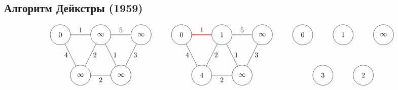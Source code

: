 \documentclass[12pt, a4paper]{article}
\begin{document}
    \subsection{Алгоритм Дейкстры (1959)}
    \[\begin{tikzpicture}
        \node[circle, draw, minimum size=1cm] (A) at (0, 0) {0};
        \node[circle, draw, minimum size=1cm] (B) at (2, 0) {$\infty$};
        \node[circle, draw, minimum size=1cm] (C) at (4, 0) {$\infty$};
        \node[circle, draw, minimum size=1cm] (D) at (1, -2) {$\infty$};
        \node[circle, draw, minimum size=1cm] (E) at (3, -2) {$\infty$};
    
        \draw (A) -- (B) node[midway, above] {1};
        \draw (A) -- (D) node[midway, left] {4};
        \draw (B) -- (D) node[midway, right] {2};
        \draw (B) -- (C) node[midway, above] {5};
        \draw (B) -- (E) node[midway, right] {1};
        \draw (C) -- (E) node[midway, right] {3};
        \draw (D) -- (E) node[midway, below] {2};
    
        \begin{scope}[shift={(6,0)}]
            \node[circle, draw, minimum size=1cm] (A1) at (0, 0) {0};
            \node[circle, draw, minimum size=1cm] (B1) at (2, 0) {1};
            \node[circle, draw, minimum size=1cm] (C1) at (4, 0) {$\infty$};
            \node[circle, draw, minimum size=1cm] (D1) at (1, -2) {4};
            \node[circle, draw, minimum size=1cm] (E1) at (3, -2) {$\infty$};
    
            \draw[red, thick] (A1) -- (B1) node[midway, above] {1};
            \draw (A1) -- (D1) node[midway, left] {4};
            \draw (B1) -- (D1) node[midway, right] {2};
            \draw (B1) -- (C1) node[midway, above] {5};
            \draw (B1) -- (E1) node[midway, right] {1};
            \draw (C1) -- (E1) node[midway, right] {3};
            \draw (D1) -- (E1) node[midway, below] {2};
        \end{scope}
    
        \begin{scope}[shift={(12,0)}]
            \node[circle, draw, minimum size=1cm] (A2) at (0, 0) {0};
            \node[circle, draw, minimum size=1cm] (B2) at (2, 0) {1};
            \node[circle, draw, minimum size=1cm] (C2) at (4, 0) {$\infty$};
            \node[circle, draw, minimum size=1cm] (D2) at (1, -2) {3};
            \node[circle, draw, minimum size=1cm] (E2) at (3, -2) {2};
    

\end{scope}
\end{tikzpicture}\]
\end{document}
